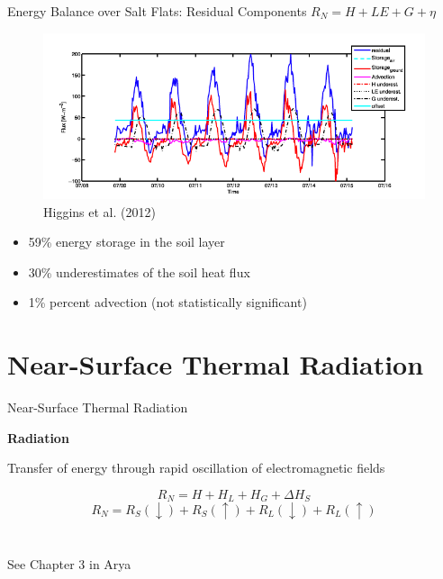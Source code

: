 \begin{frame}{Energy Balance over Salt Flats: Residual Components}
\centering $R_N = H + LE + G + \boxed{\eta}$
\begin{figure}
	\includegraphics[width=\textwidth]{fig3.png}
	\centering \newline \tiny Higgins et al. (2012)
\end{figure}
\begin{itemize}
	\item 59\% energy storage in the soil layer
	\item 30\% underestimates of the soil heat flux
	\item 1\% percent advection (not statistically significant)
\end{itemize}
\end{frame}

\section{Near-Surface Thermal Radiation} %
\begin{frame}{Near-Surface Thermal Radiation}

{\large \textbf{Radiation}}
\\\vspace{2pt}
\begin{fancydefs}
	Transfer of energy through rapid oscillation of electromagnetic fields
\end{fancydefs}
$$R_N = H + H_L + H_G + \Delta H_S$$
$$R_N = R_S(\downarrow) + R_S(\uparrow) + R_L(\downarrow) + R_L(\uparrow)$$
~\\~\\
See Chapter 3 in Arya
\end{frame}

